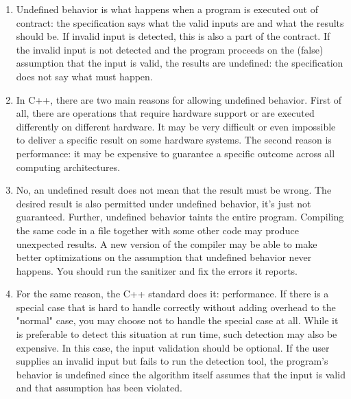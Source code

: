 \begin{enumerate}
\item 
Undefined behavior is what happens when a program is executed out of contract: the specification says what the valid inputs are and what the results should be. If invalid input is detected, this is also a part of the contract. If the invalid input is not detected and the program proceeds on the (false) assumption that the input is valid, the results are undefined: the specification does not say what must happen.

\item 
In C++, there are two main reasons for allowing undefined behavior. First of all, there are operations that require hardware support or are executed differently on different hardware. It may be very difficult or even impossible to deliver a specific result on some hardware systems. The second reason is performance: it may be expensive to guarantee a specific outcome across all computing architectures.

\item 
No, an undefined result does not mean that the result must be wrong. The desired result is also permitted under undefined behavior, it's just not guaranteed. Further, undefined behavior taints the entire program. Compiling the same code in a file together with some other code may produce unexpected results. A new version of the compiler may be able to make better optimizations on the assumption that undefined behavior never happens. You should run the sanitizer and fix the errors it reports.

\item
For the same reason, the C++ standard does it: performance. If there is a special case that is hard to handle correctly without adding overhead to the "normal" case, you may choose not to handle the special case at all. While it is preferable to detect this situation at run time, such detection may also be expensive. In this case, the input validation should be optional. If the user supplies an invalid input but fails to run the detection tool, the program's behavior is undefined since the algorithm itself assumes that the input is valid and that assumption has been violated.

\end{enumerate}